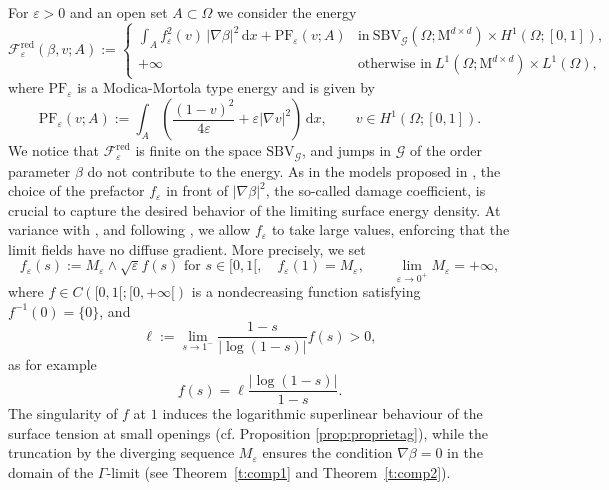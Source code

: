 \documentclass[a4paper,reqno]{amsart}
\newcommand{\SBVG}{\mathrm{SBV}_{\mathcal{G}}}
\newcommand\eps{{\varepsilon}}
\theoremstyle{remark}
\def\e{\varepsilon}
\newcommand\dx{{\,\mathrm{d}x}}
\newcommand{\F}{\mathcal{F}}
\newcommand{\G}{\mathcal{G}}
\newcommand{\Fr}{\F^{\mathrm{red}}}
\newcommand{\Mno}{\mathrm{M}^{d\times d}}
\newcommand\AT{\text{PF}}
\numberwithin{equation}{section}
\begin{document}
For $\e>0$ and an open set $A\subset\Omega$  we consider the energy
\begin{equation}\label{2611231254}
	\Fr_\varepsilon(\beta,v;A):= 
	\begin{cases}
		\displaystyle
		\int_{{A} } f_\varepsilon^2(v) \,|\nabla \beta|^2 \dx + \AT_\e(v;A)  &  \text{in}\ \SBVG(\Omega;\Mno) \times  H^1(\Omega;[0,1]), \\
		+\infty & \text{otherwise in}\  L^1(\Omega; {\Mno})\times L^1(\Omega),
	\end{cases}
\end{equation}
where $\AT_\e$ is a
Modica-Mortola type energy and is given by
\begin{equation}\label{AT}
	\AT_\e(v;A):= \int_{A} \left(\frac{(1-v)^2}{4\varepsilon}+\varepsilon |\nabla v|^2 \right) \dx,  \qquad v\in H^1(\Omega;[0,1]).
\end{equation}
We notice that $\Fr_\varepsilon$ is finite on the space $\SBVG$, and jumps in $\G$ of the order parameter $\beta$ do not contribute to the energy.
As in the models proposed in \cite{CFI14, ConFocIur25}, the choice of the prefactor $f_\varepsilon$ in front of $|\nabla\beta|^2$, the so-called damage coefficient, is crucial to capture the desired behavior  of the limiting surface energy density. At variance with \cite{CFI14, ConFocIur25}, and following \cite{CicFocZep21}, we allow $f_\varepsilon$ to take large values, enforcing that the limit fields have no diffuse gradient.
More precisely, we set
\begin{equation}\label{0105231047}
	f_\varepsilon(s):= M_\varepsilon \wedge \sqrt{\varepsilon} f(s) \text{ for }  s \in [0,1[, \quad f_\varepsilon(1)=M_\varepsilon, \qquad \lim_{\eps \to 0^+}M_\eps=+\infty,
\end{equation}
where  $f \in C([0,1[; [0,+\infty[)$ is a nondecreasing function satisfying  $f^{-1}(0)=\{0\}$, and
\begin{equation}\label{0405230818}
	\ell:=\lim_{s\to 1^-} \frac{1-s}{|\log(1-s)|}f(s)>0, 
\end{equation}
as for example
\begin{equation*}
	 f(s)=\ell \frac{|\log(1-s)|}{1-s}.
\end{equation*}
The singularity of $f$  at $1$ induces the logarithmic superlinear behaviour of the surface tension
at small openings (cf. Proposition \ref{prop:proprietag}), while the truncation by the diverging sequence $M_\e$  ensures the condition $\nabla \beta=0$ in the domain of the $\Gamma$-limit (see Theorem~\ref{t:comp1} and Theorem~\ref{t:comp2}).
\end{document}
